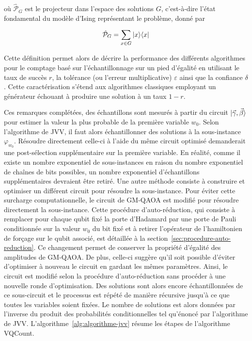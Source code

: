 où $\hat{\mathcal{P}}_{G}$ est le projecteur dans l'espace des solutions $G$, c'est-à-dire l'état fondamental du modèle d'Ising représentant le problème, donné par

\begin{equation}
    \hat{\mathcal{P}}_{G} = \sum_{x \in G} \ket{x}\!\bra{x}
\end{equation}

Cette définition permet alors de décrire la performance des différents algorithmes pour le comptage basé sur l'échantillonnage sur un pied d'égalité en utilisant le taux de succès $r$, la tolérance (ou l'erreur multiplicative) $\varepsilon$ ainsi que la confiance $\delta$. Cette caractérisation s'étend aux algorithmes classiques employant un générateur échouant à produire une solution à un taux $1 - r$.

Ces remarques complétées, des échantillons sont mesurés à partir du circuit $\ket{\vec{\gamma}, \vec{\beta}}$ pour estimer la valeur la plus probable de la première variable $w_{0}$. Selon l'algorithme de JVV, il faut alors échantillonner des solutions à la sous-instance $\varphi_{w_{0}}$. Résoudre directement celle-ci à l'aide du même circuit optimisé demanderait une post-sélection supplémentaire sur la première variable. En réalité, comme il existe un nombre exponentiel de sous-instances en raison du nombre exponentiel de chaînes de bits possibles, un nombre exponentiel d'échantillons supplémentaires devraient être retiré. Une autre méthode consiste à construire et optimiser un différent circuit pour résoudre la sous-instance. Pour éviter cette surcharge computationnelle, le circuit de GM-QAOA est modifié pour résoudre directement la sous-instance. Cette procédure d'auto-réduction, qui consiste à remplacer pour chaque qubit fixé la porte d'Hadamard par une porte de Pauli conditionnée sur la valeur $w_{0}$ du bit fixé et à retirer l'opérateur de l'hamiltonien de forçage sur le qubit associé, est détaillée à la section~\ref{sec:procedure-auto-reduction}.
Ce changement permet de conserver la propriété d'égalité des amplitudes de GM-QAOA. De plus, celle-ci suggère qu'il soit possible d'éviter d'optimiser à nouveau le circuit en gardant les mêmes paramètres. Ainsi, le circuit est modifié selon la procédure d'auto-réduction sans procéder à une nouvelle ronde d'optimisation. Des solutions sont alors encore échantillonnées de ce sous-circuit et le processus est répété de manière récursive jusqu'à ce que toutes les variables soient fixées. Le nombre de solutions est alors données par l'inverse du produit des probabilités conditionnelles tel qu'énoncé par l'algorithme de JVV. L'algorithme~\ref{alg:algorithme-jvv} résume les étapes de l'algorithme VQCount.

